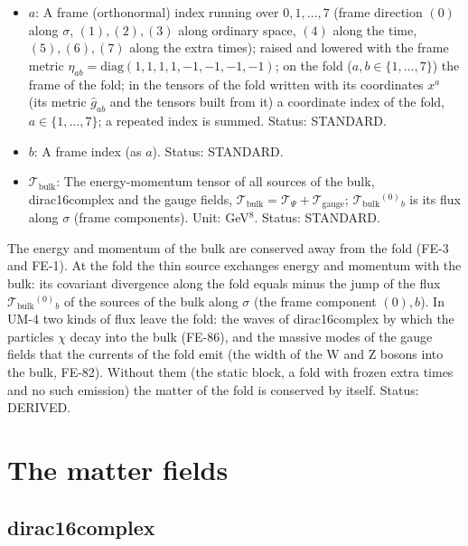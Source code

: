 \documentclass[
  10pt,
]{article}
\begin{document}
\begin{itemize}
  per unit volume of the six other directions of the fold). Unit:
  GeV\(^7\). Value: \(\kappa\mathcal{S}^a{}_b = -12H\delta^a{}_b\) for
  every \(a_4\), \(b_4\) of the author's form. Status: DERIVED.
\item
  \(a\): A frame (orthonormal) index running over \(0, 1, \dots, 7\)
  (frame direction \((0)\) along \(\sigma\), \((1), (2), (3)\) along
  ordinary space, \((4)\) along the time, \((5), (6), (7)\) along the
  extra times); raised and lowered with the frame metric
  \(\eta_{ab} = \mathrm{diag}(1, 1, 1, 1, -1, -1, -1, -1)\); on the fold
  (\(a, b \in \{1, \dots, 7\}\)) the frame of the fold; in the tensors
  of the fold written with its coordinates \(x^a\) (its metric
  \(\hat g_{ab}\) and the tensors built from it) a coordinate index of
  the fold, \(a \in \{1, \dots, 7\}\); a repeated index is summed.
  Status: STANDARD.
\item
  \(b\): A frame index (as \(a\)). Status: STANDARD.
\item
  \(\mathcal{T}_{\mathrm{bulk}}\): The energy-momentum tensor of all
  sources of the bulk, dirac16complex and the gauge fields,
  \(\mathcal{T}_{\mathrm{bulk}} = \mathcal{T}_\Psi + \mathcal{T}_{\mathrm{gauge}}\);
  \(\mathcal{T}_{\mathrm{bulk}}{}^{(0)}{}_b\) is its flux along
  \(\sigma\) (frame components). Unit: GeV\(^8\). Status: STANDARD.
\end{itemize}

The energy and momentum of the bulk are conserved away from the fold
(FE-3 and FE-1). At the fold the thin source exchanges energy and
momentum with the bulk: its covariant divergence along the fold equals
minus the jump of the flux \(\mathcal{T}_{\mathrm{bulk}}{}^{(0)}{}_b\)
of the sources of the bulk along \(\sigma\) (the frame component
\((0), b\)). In UM-4 two kinds of flux leave the fold: the waves of
dirac16complex by which the particles \(\chi\) decay into the bulk
(FE-86), and the massive modes of the gauge fields that the currents of
the fold emit (the width of the W and Z bosons into the bulk, FE-82).
Without them (the static block, a fold with frozen extra times and no
such emission) the matter of the fold is conserved by itself. Status:
DERIVED.

\hypertarget{the-matter-fields}{%
\section{The matter fields}\label{the-matter-fields}}

\hypertarget{dirac16complex}{%
\subsection{dirac16complex}\label{dirac16complex}}
\end{document}
